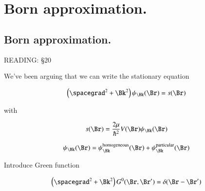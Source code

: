 %
%


\chapter{Born approximation.}
\label{chap:qmTwoL25}
\date{Dec 7, 2011}

\beginArtWithToc

%
%
\section{Born approximation.}

READING: \S 20 \cite{desai2009quantum}

We've been arguing that we can write the stationary equation 

\begin{equation}\label{eqn:qmTwoL25:10}
\left( \spacegrad^2 + \Bk^2\right) \psi_\Bk(\Br) = s(\Br)
\end{equation}

with 

\begin{equation}\label{eqn:qmTwoL25:30}
s(\Br) = \frac{2\mu}{\hbar^2} V(\Br) \psi_\Bk(\Br)
\end{equation}

\begin{equation}\label{eqn:qmTwoL25:50}
\psi_\Bk(\Br) = \psi_\Bk^{\text{homogeneous}}(\Br) + \psi_\Bk^{\text{particular}}(\Br)
\end{equation}

Introduce Green function

\begin{equation}\label{eqn:qmTwoL25:70}
\left( \spacegrad^2 + \Bk^2\right) G^0(\Br, \Br') = \delta(\Br- \Br')
\end{equation}

